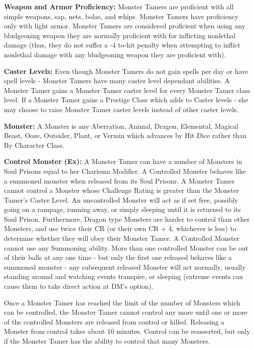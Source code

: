 \classfeatures

\textbf{Weapon and Armor Proficiency:} Monster Tamers are proficient with all simple weapons, sap, nets, bolas, and whips. Monster Tamers have proficiency only with light armor. Monster Tamers are considered proficient when using any bludgeoning weapon they are normally proficient with for inflicting nonlethal damage (thus, they do not suffer a -4 to-hit penalty when attempting to inflict nonlethal damage with any bludgeoning weapon they are proficient with).

\textbf{Caster Levels:} Even though Monster Tamers do not gain spells per day or have spell levels - Monster Tamers have many caster level dependant abilities. A Monster Tamer gains a Monster Tamer caster level for every Monster Tamer class level. If a Monster Tamer gains a Prestige Class which adds to Caster levels - she may choose to raise Monster Tamer caster levels instead of other caster levels.

\textbf{Monster:} A Monster is any Aberration, Animal, Dragon, Elemental, Magical Beast, Ooze, Outsider, Plant, or Vermin which advances by Hit Dice rather than By Character Class.

\textbf{Control Monster (Ex):} A Monster Tamer can have a number of Monsters in Soul Prisons equal to her Charisma Modifier. A Controlled Monster behaves like a summoned monster when released from its Soul Prisonr. A Monster Tamer cannot control a Monster whose Challenge Rating is greater than the Monster Tamer's Caster Level.
An uncontrolled Monster will act as if set free, possibly going on a rampage, running away, or simply sleeping until it is returned to its Soul Prison. 
Furthermore, Dragon type Monsters are harder to control than other Monsters, and use twice their CR (or their own CR + 4, whichever is less) to determine whether they will obey their Monster Tamer. A Controlled Monster cannot use any Summoning ability. More than one controlled Monster can be out of their balls at any one time - but only the first one released behaves like a summoned monster - any subsequent released Monster will act normally, usually standing around and watching events transpire, or sleeping (extreme events can cause them to take direct action at DM's option).

Once a Monster Tamer has reached the limit of the number of Monsters which can be controlled, the Monster Tamer cannot control any more until one or more of the controlled Monsters are released from control or killed. Releasing a Monster from control takes about 10 minutes. Control can be reasserted, but only if the Monster Tamer has the ability to control that many Monsters.

